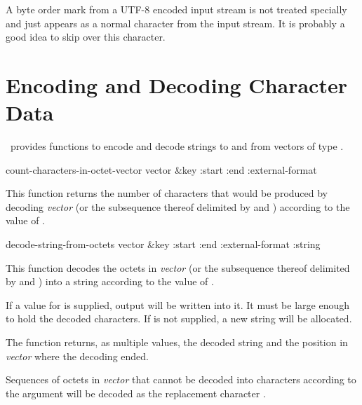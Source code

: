 A byte order mark from a UTF-8 encoded input stream is not treated
specially and just appears as a normal character from the input
stream. It is probably a good idea to skip over this character.

\section{Encoding and Decoding Character Data}

\CCL\ provides functions to encode and decode strings to and from
vectors of type .

\begin{defun}[Function]
count-characters-in-octet-vector vector &key :start :end :external-format

This function returns the number of characters that would be produced
by decoding {\it vector} (or the subsequence thereof delimited by
 and ) according to the value of .
\end{defun}

\begin{defun}[Function]
decode-string-from-octets vector &key :start :end :external-format :string

This function decodes the octets in {\it vector} (or the subsequence thereof
delimited by  and ) into a string according to the
value of .

If a value for  is supplied, output will be written into it.  It
must be large enough to hold the decoded characters.  If  is
not supplied, a new string will be allocated.

The function returns, as multiple values, the decoded string and the
position in {\it vector} where the decoding ended.

Sequences of octets in {\it vector} that cannot be decoded into
characters according to the  argument will be
decoded as the replacement character .
\end{defun}



